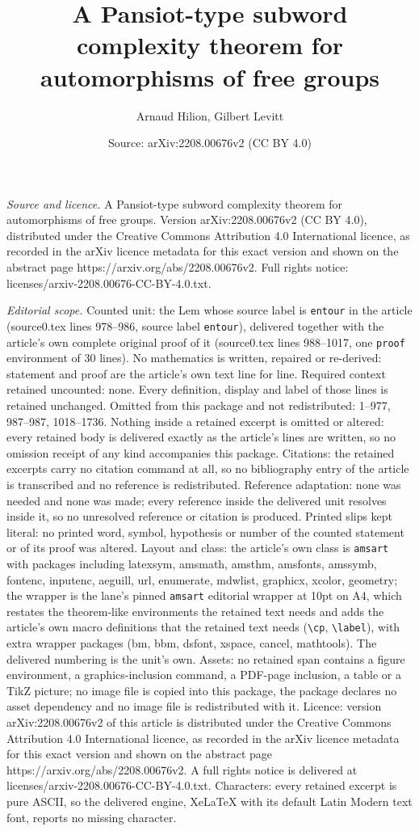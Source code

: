 \documentclass[10pt,a4paper]{amsart}
\title[A Pansiot-type subword complexity theorem for automorphisms ]{A Pansiot-type subword complexity theorem for automorphisms of free groups}
\author{Arnaud Hilion, Gilbert Levitt}
\date{Source: arXiv:2208.00676v2 (CC BY 4.0)}
\begin{document}
\maketitle

\noindent\emph{Source and licence.} A Pansiot-type subword complexity theorem for automorphisms of free groups. Version arXiv:2208.00676v2 (CC BY 4.0), distributed under the Creative Commons Attribution 4.0 International licence, as recorded in the arXiv licence metadata for this exact version and shown on the abstract page https://arxiv.org/abs/2208.00676v2. Full rights notice: licenses/arxiv-2208.00676-CC-BY-4.0.txt.\par\smallskip

\noindent\textit{Editorial scope.} Counted unit: the Lem whose source label is \texttt{entour} in the article (source0.tex lines 978--986, source label \texttt{entour}), delivered together with the article's own complete original proof of it (source0.tex lines 988--1017, one \texttt{proof} environment of 30 lines). No mathematics is written, repaired or re-derived: statement and proof are the article's own text line for line. Required context retained uncounted: none. Every definition, display and label of those lines is retained unchanged. Omitted from this package and not redistributed: 1--977, 987--987, 1018--1736. Nothing inside a retained excerpt is omitted or altered: every retained body is delivered exactly as the article's lines are written, so no omission receipt of any kind accompanies this package. Citations: the retained excerpts carry no citation command at all, so no bibliography entry of the article is transcribed and no reference is redistributed. Reference adaptation: none was needed and none was made; every reference inside the delivered unit resolves inside it, so no unresolved reference or citation is produced. Printed slips kept literal: no printed word, symbol, hypothesis or number of the counted statement or of its proof was altered. Layout and class: the article's own class is \texttt{amsart} with packages including latexsym, amsmath, amsthm, amsfonts, amssymb, fontenc, inputenc, aeguill, url, enumerate, mdwlist, graphicx, xcolor, geometry; the wrapper is the lane's pinned \texttt{amsart} editorial wrapper at 10pt on A4, which restates the theorem-like environments the retained text needs and adds the article's own macro definitions that the retained text needs (\texttt{\textbackslash cp}, \texttt{\textbackslash label}), with extra wrapper packages (bm, bbm, dsfont, xspace, cancel, mathtools). The delivered numbering is the unit's own. Assets: no retained span contains a figure environment, a graphics-inclusion command, a PDF-page inclusion, a table or a TikZ picture; no image file is copied into this package, the package declares no asset dependency and no image file is redistributed with it. Licence: version arXiv:2208.00676v2 of this article is distributed under the Creative Commons Attribution 4.0 International licence, as recorded in the arXiv licence metadata for this exact version and shown on the abstract page https://arxiv.org/abs/2208.00676v2. A full rights notice is delivered at licenses/arxiv-2208.00676-CC-BY-4.0.txt. Characters: every retained excerpt is pure ASCII, so the delivered engine, XeLaTeX with its default Latin Modern text font, reports no missing character.
\end{document}

